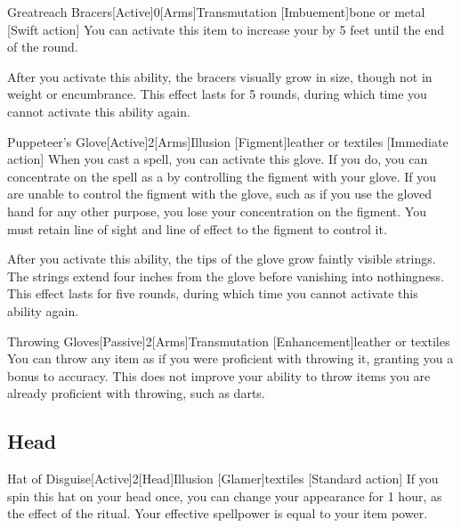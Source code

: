         \begin{magicitemdef}{Greatreach Bracers}[Active]{0}[Arms]{Transmutation [Imbuement]}{bone or metal}
            [Swift action] You can activate this item to increase your  by 5 feet until the end of the round.

            After you activate this ability, the bracers visually grow in size, though not in weight or encumbrance.
            This effect lasts for 5 rounds, during which time you cannot activate this ability again.
        \end{magicitemdef}

        \begin{magicitemdef}{Puppeteer's Glove}[Active]{2}[Arms]{Illusion [Figment]}{leather or textiles}
            [Immediate action] When you cast a  spell, you can activate this glove.
            If you do, you can concentrate on the spell as a  by controlling the figment with your glove.
            If you are unable to control the figment with the glove, such as if you use the gloved hand for any other purpose, you lose your concentration on the figment.
            You must retain line of sight and line of effect to the figment to control it.

            After you activate this ability, the tips of the glove grow faintly visible strings.
            The strings extend four inches from the glove before vanishing into nothingness.
            This effect lasts for five rounds, during which time you cannot activate this ability again.
        \end{magicitemdef}

        \begin{magicitemdef}{Throwing Gloves}[Passive]{2}[Arms]{Transmutation [Enhancement]}{leather or textiles}
             You can throw any item as if you were proficient with throwing it, granting you a  bonus to accuracy.
            This does not improve your ability to throw items you are already proficient with throwing, such as darts.
        \end{magicitemdef}

    \subsection{Head}

        \begin{magicitemdef}{Hat of Disguise}[Active]{2}[Head]{Illusion [Glamer]}{textiles}
            [Standard action] If you spin this hat on your head once, you can change your appearance for 1 hour, as the effect of the  ritual.
            Your effective spellpower is equal to your item power.
        \end{magicitemdef}

